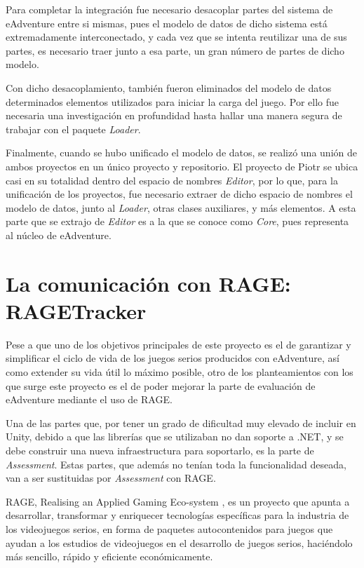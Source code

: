 Para completar la integración fue necesario desacoplar partes del sistema de eAdventure entre si mismas, pues el modelo de datos de dicho sistema está extremadamente interconectado, y cada vez que se intenta reutilizar una de sus partes, es necesario traer junto a esa parte, un gran número de partes de dicho modelo. 

Con dicho desacoplamiento, también fueron eliminados del modelo de datos determinados elementos utilizados para iniciar la carga del juego. Por ello fue necesaria una investigación en profundidad hasta hallar una manera segura de trabajar con el paquete \textit{Loader}.

Finalmente, cuando se hubo unificado el modelo de datos, se realizó una unión de ambos proyectos en un único proyecto y repositorio. El proyecto de Piotr se ubica casi en su totalidad dentro del espacio de nombres \textit{Editor}, por lo que, para la unificación de los proyectos, fue necesario extraer de dicho espacio de nombres el modelo de datos, junto al \textit{Loader}, otras clases auxiliares, y más elementos. A esta parte que se extrajo de \textit{Editor} es a la que se conoce como \textit{Core}, pues representa al núcleo de eAdventure.

\newpage

\section{La comunicación con RAGE: RAGETracker}
\label{ragetrackerit2}

Pese a que uno de los objetivos principales de este proyecto es el de garantizar y simplificar el ciclo de vida de los juegos serios producidos con eAdventure, así como extender su vida útil lo máximo posible, otro de los planteamientos con los que surge este proyecto es el de poder mejorar la parte de evaluación de eAdventure mediante el uso de RAGE.

Una de las partes que, por tener un grado de dificultad muy elevado de incluir en Unity, debido a que las librerías que se utilizaban no dan soporte a .NET, y se debe construir una nueva infraestructura para soportarlo, es la parte de \textit{Assessment}. Estas partes, que además no tenían toda la funcionalidad deseada, van a ser sustituidas por \textit{Assessment} con RAGE.

RAGE, Realising an Applied Gaming Eco-system \cite{Steiner2016}, es un proyecto que apunta a desarrollar, transformar y enriquecer tecnologías específicas para la industria de los videojuegos serios, en forma de paquetes autocontenidos para juegos que ayudan a los estudios de videojuegos en el desarrollo de juegos serios, haciéndolo más sencillo, rápido y eficiente económicamente.

